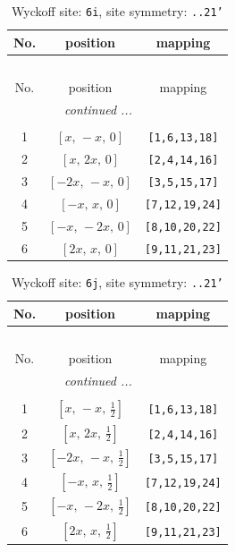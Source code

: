 \documentclass[fleqn,8pt]{jsarticle}
\begin{document}
\renewcommand{\arraystretch}{1.2}
\begin{longtable}{ccc}
\caption{Wyckoff site: {\tt 6i}, site symmetry: {\tt ..21'}}
 \\
 \hline \hline
No. & position & mapping \\ \hline \endfirsthead

\multicolumn{2}{l}{\tablename\ \thetable{}} \\
 \hline \hline
No. & position & mapping \\ \hline \endhead

 \hline \hline
\multicolumn{2}{r}{\footnotesize\it continued ...} \\ \endfoot

 \hline \hline
\multicolumn{2}{r}{} \\ \endlastfoot

1 & $\left[ x,\, - x,\, 0 \right]$ & {\tt [1,6,13,18]} \\ \hline
2 & $\left[ x,\, 2 x,\, 0 \right]$ & {\tt [2,4,14,16]} \\ \hline
3 & $\left[ - 2 x,\, - x,\, 0 \right]$ & {\tt [3,5,15,17]} \\ \hline
4 & $\left[ - x,\, x,\, 0 \right]$ & {\tt [7,12,19,24]} \\ \hline
5 & $\left[ - x,\, - 2 x,\, 0 \right]$ & {\tt [8,10,20,22]} \\ \hline
6 & $\left[ 2 x,\, x,\, 0 \right]$ & {\tt [9,11,21,23]} \\
\end{longtable}
\renewcommand{\arraystretch}{1.2}
\begin{longtable}{ccc}
\caption{Wyckoff site: {\tt 6j}, site symmetry: {\tt ..21'}}
 \\
 \hline \hline
No. & position & mapping \\ \hline \endfirsthead

\multicolumn{2}{l}{\tablename\ \thetable{}} \\
 \hline \hline
No. & position & mapping \\ \hline \endhead

 \hline \hline
\multicolumn{2}{r}{\footnotesize\it continued ...} \\ \endfoot

 \hline \hline
\multicolumn{2}{r}{} \\ \endlastfoot

1 & $\left[ x,\, - x,\, \frac{1}{2} \right]$ & {\tt [1,6,13,18]} \\ \hline
2 & $\left[ x,\, 2 x,\, \frac{1}{2} \right]$ & {\tt [2,4,14,16]} \\ \hline
3 & $\left[ - 2 x,\, - x,\, \frac{1}{2} \right]$ & {\tt [3,5,15,17]} \\ \hline
4 & $\left[ - x,\, x,\, \frac{1}{2} \right]$ & {\tt [7,12,19,24]} \\ \hline
5 & $\left[ - x,\, - 2 x,\, \frac{1}{2} \right]$ & {\tt [8,10,20,22]} \\ \hline
6 & $\left[ 2 x,\, x,\, \frac{1}{2} \right]$ & {\tt [9,11,21,23]} \\
\end{longtable}
\end{document}
